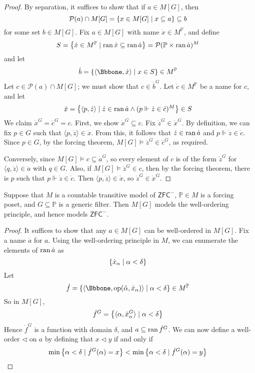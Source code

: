 \begin{proof}
    By separation, it suffices to show that if \( a \in M[G] \), then
    \[ \mathcal P(a) \cap M[G] = \qty{x \in M[G] \mid x \subseteq a} \subseteq b \]
    for some set \( b \in M[G] \).
    Fix \( a \in M[G] \) with name \( \dot x \in M^{\mathbb P} \), and define
    \[ S = \qty{\dot x \in M^{\mathbb P} \mid \operatorname{ran}\dot x \subseteq \operatorname{ran}\dot a} = \mathcal P(\mathbb P \times \operatorname{ran} \dot a)^M \]
    and let
    \[ \dot b = \qty{\langle \Bbbone, \dot x \rangle \mid x \in S} \in M^{\mathbb P} \]
    Let \( c \in \mathcal P(a) \cap M[G] \); we must show that \( c \in \dot b^G \).
    Let \( \dot c \in M^{\mathbb P} \) be a name for \( c \), and let
    \[ \dot x = \qty{\langle p, \dot z \rangle \mid \dot z \in \operatorname{ran}\dot a \wedge (p \Vdash \dot z \in \dot c)^M} \in S \]
    We claim \( \dot x^G = \dot c^G = c \).
    First, we show \( \dot x^G \subseteq c \).
    Fix \( \dot z^G \in \dot x^G \).
    By definition, we can fix \( p \in G \) such that \( \langle p, \dot z \rangle \in \dot x \).
    From this, it follows that \( \dot z \in \operatorname{ran} \dot a \) and \( p \Vdash \dot z \in \dot c \).
    Since \( p \in G \), by the forcing theorem, \( M[G] \vDash \dot z^G \in \dot c^G \), as required.

    Conversely, since \( M[G] \vDash c \subseteq \dot a^G \), so every element of \( c \) is of the form \( \dot z^G \) for \( \langle q, \dot z \rangle \in \dot a \) with \( q \in G \).
    Also, if \( M[G] \vDash \dot z^G \in c \), then by the forcing theorem, there is \( p \) such that \( p \Vdash \dot z \in \dot c \).
    Then \( \langle p, \dot z \rangle \in \dot x \), so \( \dot z^G \in \dot x^G \).
\end{proof}
\begin{lemma}
    Suppose that \( M \) is a countable transitive model of \( \mathsf{ZFC}^- \), \( \mathbb P \in M \) is a forcing poset, and \( G \subseteq \mathbb P \) is a generic filter.
    Then \( M[G] \) models the well-ordering principle, and hence models \( \mathsf{ZFC}^- \).
\end{lemma}
\begin{proof}
    It suffices to show that any \( a \in M[G] \) can be well-ordered in \( M[G] \).
    Fix a name \( \dot a \) for \( a \).
    Using the well-ordering principle in \( M \), we can enumerate the elements of \( \operatorname{ran} \dot a \) as
    \[ \qty{\dot x_\alpha \mid \alpha < \delta} \]
    Let
    \[ \dot f = \qty{\langle \Bbbone, \operatorname{op}(\check \alpha, \dot x_\alpha) \rangle \mid \alpha < \delta} \in M^{\mathbb P} \]
    So in \( M[G] \),
    \[ \dot f^G = \qty{\langle \alpha, \dot x_\alpha^G \rangle \mid \alpha < \delta} \]
    Hence \( \dot f^G \) is a function with domain \( \delta \), and \( a \subseteq \operatorname{ran} \dot f^G \).
    We can now define a well-order \( \triangleleft \) on \( a \) by defining that \( x \triangleleft y \) if and only if
    \[ \min\qty{\alpha < \delta \mid \dot f^G(\alpha) = x} < \min\qty{\alpha < \delta \mid \dot f^G(\alpha) = y} \]
\end{proof}
